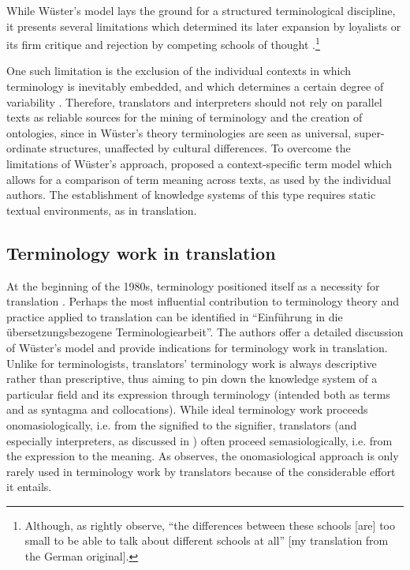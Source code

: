 While Wüster's model lays the ground for a structured terminological discipline, it presents several limitations which determined its later expansion by loyalists or its firm critique and rejection by competing schools of thought \citep{cabre_castellvi_theories_2003,drewer_terminologie_2019}.\footnote{Although, as \citet{drewer_terminologie_2019} rightly observe, ``the differences between these schools [are] too small to be able to talk about different schools at all'' [my translation from the German original].}

One such limitation is the exclusion of the individual contexts in which terminology is inevitably embedded, and which determines a certain degree of variability \citep{will_terminology_2007}. Therefore, translators and interpreters should not rely on parallel texts as reliable sources for the mining of terminology and the creation of ontologies, since in Wüster's theory terminologies are seen as universal, super-ordinate structures, unaffected by cultural differences. To overcome the limitations of Wüster's approach, \citet{gerzymisch-arbogast_termini_1996} proposed a context-specific term model which allows for a comparison of term meaning across texts, as used by the individual authors. The establishment of knowledge systems of this type requires static textual environments, as in translation.

\subsection{Terminology work in translation} \label{termworktrans}
At the beginning of the 1980s, terminology positioned itself as a necessity for translation \citep[84]{drewer_terminologiearbeit_2019}. Perhaps the most influential contribution to terminology theory and practice applied to translation can be identified in  ``Einführung in die übersetzungsbezogene Terminologiearbeit''. The authors offer a detailed discussion of Wüster's model and provide indications for terminology work in translation. Unlike for terminologists, translators' terminology work is always descriptive rather than prescriptive, thus aiming to pin down the knowledge system of a particular field and its expression through terminology (intended both as terms and as syntagma and collocations). While ideal terminology work proceeds onomasiologically, i.e. from the signified to the signifier, translators (and especially interpreters, as discussed in ) often proceed semasiologically, i.e. from the expression to the meaning. As \citet[103]{drewer_terminologiearbeit_2019} observes, the onomasiological approach is only rarely used in terminology work by translators because of the considerable effort it entails.

